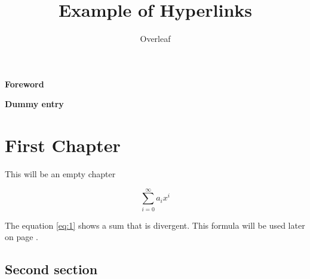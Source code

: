 \documentclass{book}
\title{Example of Hyperlinks}
\author{Overleaf}
\begin{document}
\frontmatter
\tableofcontents
\clearpage

{\huge {\bf Foreword}}

\Blindtext
\clearpage

{\huge {\bf Dummy entry}}

\Blindtext
\mainmatter

\chapter{First Chapter}

This will be an empty chapter

\begin{equation}
\label{eq:1}
\sum_{i=0}^{\infty} a_i x^i
\end{equation}

The equation \ref{eq:1} shows a sum that is divergent. This formula will be used later on page \pageref{second}.

\Blindtext
\clearpage

\section{Second section} \label{second}

\blindtext
\Blinddocument
\end{document}
